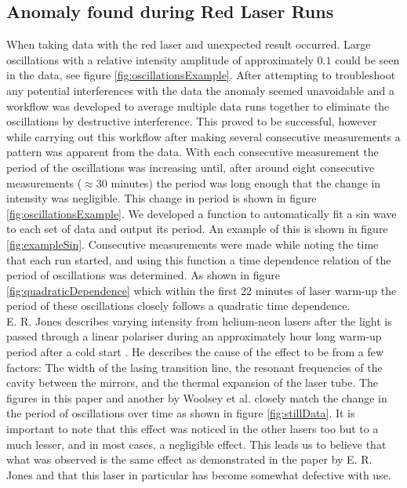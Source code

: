 \documentclass[%
reprint,
amsmath,amssymb,
aps,
]{revtex4-2}
\begin{document}
		\subsection{Anomaly found during Red Laser Runs}
			When taking data with the red laser and unexpected result occurred. Large oscillations with a relative intensity amplitude of approximately $0.1$ could be seen in the data, see figure \ref{fig:oscillationsExample}. After attempting to troubleshoot any potential interferences with the data the anomaly seemed unavoidable and a workflow was developed to average multiple data runs together to eliminate the oscillations by destructive interference. This proved to be successful, however while carrying out this workflow after making several consecutive measurements a pattern was apparent from the data. With each consecutive measurement the period of the oscillations was increasing until, after around eight consecutive measurements ($\approx$30 minutes) the period was long enough that the change in intensity was negligible. This change in period is shown in figure \ref{fig:oscillationsExample}. We developed a function to automatically fit a sin wave to each set of data and output its period. An example of this is shown in figure \ref{fig:exampleSin}. Consecutive measurements were made while noting the time that each run started, and using this function a time dependence relation of the period of oscillations was determined. As shown in figure \ref{fig:quadraticDependence} which within the first 22 minutes of laser warm-up the period of these oscillations closely follows a quadratic time dependence. \\
			
			E. R. Jones describes varying intensity from helium-neon lasers after the light is passed through a linear polariser during an approximately hour long warm-up period after a cold start \cite{jonesPolarisation}. He describes the cause of the effect to be from a few factors: The width of the lasing transition line, the resonant frequencies of the cavity between the mirrors, and the thermal expansion of the laser tube. The figures in this paper and another by Woolsey et al. \cite{woolseyPolarisation} closely match the change in the period of oscillations over time as shown in figure \ref{fig:stillData}. It is important to note that this effect was noticed in the other lasers too but to a much lesser, and in most cases, a negligible effect. This leads us to believe that what was observed is the same effect as demonstrated in the paper by E. R. Jones and that this laser in particular has become somewhat defective with use.
			
\end{document}
